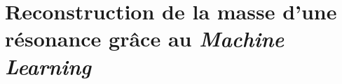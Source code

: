 \chapter{Reconstruction de la masse d'une résonance grâce au \emph{Machine Learning}}\label{chapter-ML}

\newpage









